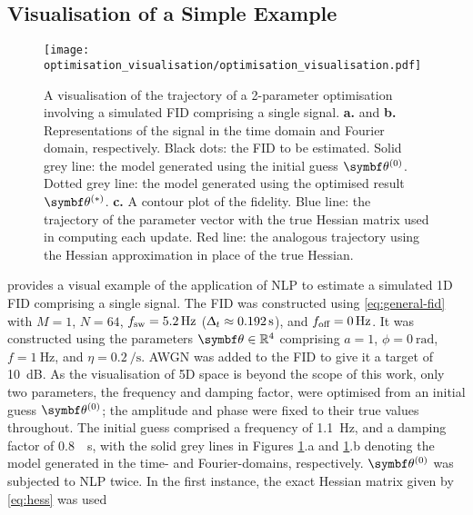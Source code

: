 \subsection{Visualisation of a Simple Example}
\label{subsec:optim-vis}
\begin{figure}
    \centering
    \texttt{[image: optimisation\_visualisation/optimisation\_visualisation.pdf]}
    \caption[
        A visualisation of the trajectory of a 2-parameter optimisation
        involving a simulated \acs{FID}.
    ]
    {
        A visualisation of the trajectory of a 2-parameter optimisation
        involving a simulated \acs{FID} comprising a single signal.
        \textbf{a.} and \textbf{b.} Representations of the signal in
        the time domain and Fourier domain, respectively.
        Black dots: the \ac{FID} to be estimated.
        Solid grey line: the model generated
        using the initial guess $\bthzero$.
        Dotted grey line: the model generated using the optimised result
        $\bthstar$.
        \textbf{c.} A contour plot of the fidelity.
        Blue line: the trajectory of the parameter vector with the true
        Hessian matrix used in computing each update.
        Red line: the analogous trajectory using the Hessian approximation
        in place of the true Hessian.
    }
    \label{fig:optim-vis}
\end{figure}
 provides a visual example of the application of \ac{NLP}
to estimate a simulated \ac{1D} \ac{FID} comprising a single signal.
The FID was constructed using \cref{eq:general-fid} with $M=1$,
$N = 64$, $f_{\mathrm{sw}} = \qty{5.2}{\hertz}$ ($\Updelta_t \approx
\qty{0.192}{\second}$), and $f_{\text{off}} = \qty{0}{\hertz}$.
It was constructed using the parameters $\bth \in \mathbb{R}^4$ comprising $a=1$,
$\phi=\qty{0}{\radian}$, $f=\qty{1}{\hertz}$, and $\eta=\qty{0.2}{\per\second}$.
\ac{AWGN}\label{corr:awgn}
was added to the \ac{FID} to give it a target  of
\qty{10}{\deci\bel}. As the visualisation of 5D space is beyond the scope of
this work, only two parameters, the frequency and damping factor, were optimised
from an initial guess $\bthzero$; the amplitude and phase were fixed to
their true values throughout. The initial guess comprised a frequency of
\qty{1.1}{\hertz}, and a damping factor of \qty{0.8}{\per\second}, with the
solid grey lines in Figures \ref{fig:optim-vis}.a and \ref{fig:optim-vis}.b
denoting the model generated in the time- and
Fourier-domains, respectively. $\bthzero$ was subjected to \ac{NLP} twice. In
the first instance, the exact Hessian matrix given by \cref{eq:hess} was used
